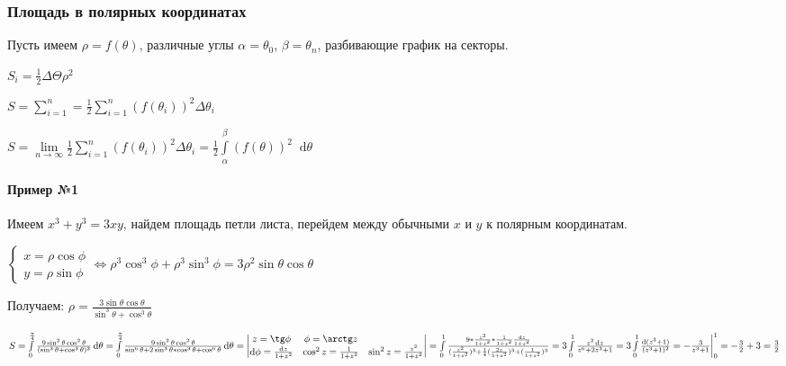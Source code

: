 \documentclass{article}
\newcommand*\diff{\mathop{}\!\mathrm{d}}
\begin{document}
\subsubsection{Площадь в полярных координатах}

Пусть имеем $\rho = f (\theta)$, различные углы $\alpha = \theta_0$, $\beta = \theta_{n}$, разбивающие график на секторы.

\hfill

$S_{i} = \frac{1}{2} \Delta \Theta \rho^2$

$S = \sum\limits_{i = 1}^{n} = \frac{1}{2} \sum\limits_{i = 1}^{n} (f(\theta_i))^2 \Delta \theta_i$

$S = \lim\limits_{n \to \infty} \frac{1}{2} \sum\limits_{i = 1}^{n} (f(\theta_i))^2 \Delta \theta_i = \frac{1}{2} \int\limits_{\alpha}^{\beta} (f(\theta))^2 \diff \theta$

\paragraph{Пример №1}

Имеем $x^3 + y^3 = 3 x y$, найдем площадь петли листа, перейдем между обычными $x$ и $y$ к полярным координатам.

$\begin{cases}
    x = \rho \cos \phi \\
    y = \rho \sin \phi
\end{cases} \Longleftrightarrow \rho^3 \cos^3 \phi + \rho^3 \sin^3 \phi = 3 \rho^2 \sin \theta \cos \theta$

Получаем: $\rho = \frac{3 \sin \theta \cos \theta}{\sin^3 \theta + \cos^3 \theta}$

\hfill

$S = \int\limits_{0}^{\frac{\pi}{4}} \frac{9\sin^2 \theta \cos^2 \theta}{(\sin^3 \theta + \cos^3 \theta)^2} \diff \theta = \int\limits_{0}^{\frac{\pi}{4}} \frac{9\sin^2 \theta \cos^2 \theta}{\sin^6 \theta + 2 \sin^3 \theta * \cos^3 \theta + \cos^6 \theta} \diff \theta = \begin{vmatrix}
    z = \tg \phi & \phi = \arctg z \\
    \diff \phi = \frac{\diff z}{1 + z^2} & \cos^2 z = \frac{1}{1 + z^2} & \sin^2 z = \frac{z^2}{1 + z^2} 
\end{vmatrix} = \int\limits_{0}^{1} \frac{9 * \frac{z^2}{1 + z^2} * \frac{1}{1 + z^2} \frac{\diff z}{1 + z^2}}{(\frac{z^2}{1 + z^2})^3 + \frac{1}{4} (\frac{2 z}{1 + z^2})^3 + (\frac{1}{1 + z^2})^3} = 3 \int\limits_{0}^{1} \frac{z^2 \diff z}{z^6 + 2z^3 + 1} = 3 \int\limits_{0}^{1} \frac{\diff (z^3 + 1)}{(z^3 + 1)^2} = - \frac{3}{z^3 + 1} \bigg|_{0}^{1} = - \frac{3}{2} + 3 = \frac{3}{2}$
\end{document}
